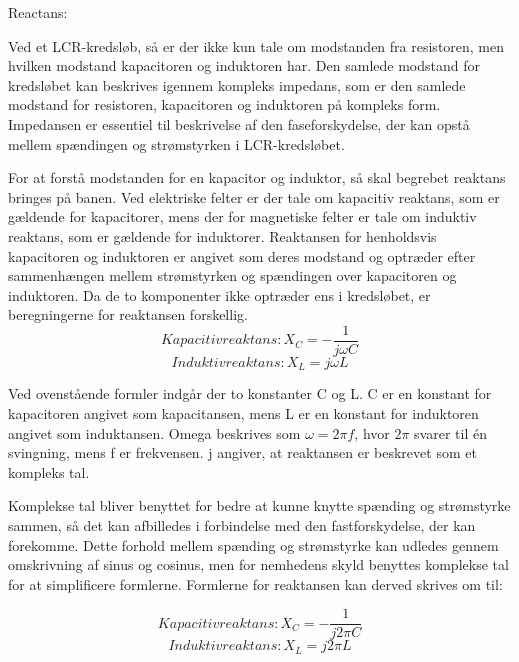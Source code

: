 

Reactans:

Ved et LCR-kredsløb, så er der ikke kun tale om modstanden fra resistoren, men hvilken modstand kapacitoren og induktoren har. Den samlede modstand for kredsløbet kan beskrives igennem kompleks impedans, som er den samlede modstand for resistoren, kapacitoren og induktoren på kompleks form. Impedansen er essentiel til beskrivelse af den faseforskydelse, der kan opstå mellem spændingen og strømstyrken i LCR-kredsløbet.

For at forstå modstanden for en kapacitor og induktor, så skal begrebet reaktans bringes på banen. Ved elektriske felter er der tale om kapacitiv reaktans, som er gældende for kapacitorer, mens der for magnetiske felter er tale om induktiv reaktans, som er gældende for induktorer. Reaktansen for henholdsvis kapacitoren og induktoren er angivet som deres modstand og optræder efter sammenhængen mellem strømstyrken og spændingen over kapacitoren og induktoren. Da de to komponenter ikke optræder ens i kredsløbet, er beregningerne for reaktansen forskellig.
\begin{equation}
Kapacitiv reaktans: X_C = - \frac{1}{j \omega C}
\end{equation}
\begin{equation}
Induktiv reaktans: X_L = j \omega L
\end{equation}

Ved ovenstående formler indgår der to konstanter C og L. C er en konstant for kapacitoren angivet som kapacitansen, mens L er en konstant for induktoren angivet som induktansen. Omega beskrives som $\omega = 2 \pi f$, hvor $2 \pi$ svarer til én svingning, mens f er frekvensen. j angiver, at reaktansen er beskrevet som et kompleks tal.

Komplekse tal bliver benyttet for bedre at kunne knytte spænding og strømstyrke sammen, så det kan afbilledes i forbindelse med den fastforskydelse, der kan forekomme. Dette forhold mellem spænding og strømstyrke kan udledes gennem omskrivning af sinus og cosinus, men for nemhedens skyld benyttes komplekse tal for at simplificere formlerne. Formlerne for reaktansen kan derved skrives om til:

\begin{equation}
Kapacitiv reaktans: X_C = - \frac{1}{j 2 \pi C}
\end{equation}
\begin{equation}
Induktiv reaktans: X_L = j 2 \pi L
\end{equation}


